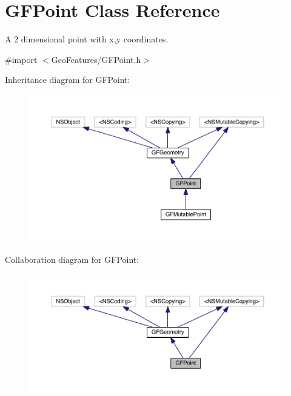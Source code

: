 \hypertarget{interface_g_f_point}{}\section{G\+F\+Point Class Reference}
\label{interface_g_f_point}


A 2 dimensional point with x,y coordinates.  




{\ttfamily \#import $<$Geo\+Features/\+G\+F\+Point.\+h$>$}



Inheritance diagram for G\+F\+Point\+:
\nopagebreak
\begin{figure}[H]
\begin{center}
\leavevmode
\includegraphics[width=350pt]{interface_g_f_point__inherit__graph}
\end{center}
\end{figure}


Collaboration diagram for G\+F\+Point\+:
\nopagebreak
\begin{figure}[H]
\begin{center}
\leavevmode
\includegraphics[width=350pt]{interface_g_f_point__coll__graph}
\end{center}
\end{figure}
